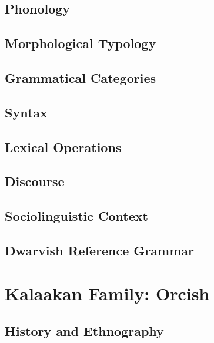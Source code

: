 \documentclass[12pt,letterpaper,openany,twoside]{memoir}
\let\originalpart=\part
\def\part{\cleardoublepage\originalpart}
\begin{document}
\chapter{Phonology}

\chapter{Morphological Typology}

\chapter{Grammatical Categories}

\chapter{Syntax}

\chapter{Lexical Operations}

\chapter{Discourse}

\chapter{Sociolinguistic Context}

\chapter{Dwarvish Reference Grammar}

\part{Kalaakan Family: Orcish}

\chapter{History and Ethnography}
\end{document}
